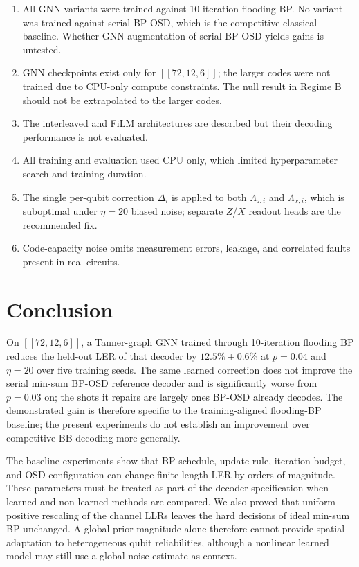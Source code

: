 \documentclass[a4paper,twocolumn,11pt,nopdfoutputerror]{quantumarticle}
\newcommand{\llr}{\Lambda}
\newcommand{\code}[3]{\ensuremath{[\![#1,#2,#3]\!]}}
\begin{document}
\begin{enumerate}[leftmargin=*,topsep=3pt,itemsep=2pt,
                  label=(\roman*)]
\item All GNN variants were trained against 10-iteration
      flooding BP. No variant was trained against serial BP-OSD,
      which is the competitive classical baseline. Whether GNN
      augmentation of serial BP-OSD yields gains is untested.
\item GNN checkpoints exist only for $\code{72}{12}{6}$; the
      larger codes were not trained due to CPU-only compute
      constraints. The null result in Regime B should not be
      extrapolated to the larger codes.
\item The interleaved and FiLM architectures are described but their
      decoding performance is not evaluated.
\item All training and evaluation used CPU only, which limited
      hyperparameter search and training duration.
\item The single per-qubit correction $\Delta_i$ is applied to
      both $\llr_{z,i}$ and $\llr_{x,i}$, which is suboptimal
      under $\eta = 20$ biased noise; separate $Z$/$X$ readout
      heads are the recommended fix.
\item Code-capacity noise omits measurement errors, leakage,
      and correlated faults present in real circuits.
\end{enumerate}

\section{Conclusion}\label{sec:conclusion}

On $\code{72}{12}{6}$, a Tanner-graph GNN trained through
10-iteration flooding BP reduces the held-out LER of that decoder by
$12.5\%\pm0.6\%$ at $p=0.04$ and $\eta=20$ over five training seeds. The
same learned correction does not improve the serial min-sum BP-OSD
reference decoder and is significantly worse from $p=0.03$ on; the shots
it repairs are largely ones BP-OSD already decodes. The demonstrated gain is therefore specific
to the training-aligned flooding-BP baseline; the present experiments do
not establish an improvement over competitive BB decoding more generally.

The baseline experiments show that BP schedule, update rule, iteration
budget, and OSD configuration can change finite-length LER by orders of
magnitude. These parameters must be treated as part of the decoder
specification when learned and non-learned methods are compared. We also
proved that uniform positive rescaling of the channel LLRs leaves the
hard decisions of ideal min-sum BP unchanged. A global prior magnitude
alone therefore cannot provide spatial adaptation to heterogeneous qubit
reliabilities, although a nonlinear learned model may still use a global
noise estimate as context.
\end{document}
